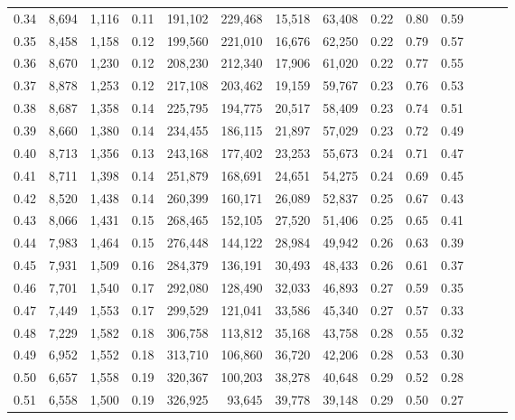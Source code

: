 \begin{tabular}{rrrrrrrrrrrrrr}
0.34 &   8,694 &  1,116 &  0.11 &  191,102 &  229,468 &  15,518 &  63,408 &  0.22 &  0.80 &      0.59 \\
0.35 &   8,458 &  1,158 &  0.12 &  199,560 &  221,010 &  16,676 &  62,250 &  0.22 &  0.79 &      0.57 \\
0.36 &   8,670 &  1,230 &  0.12 &  208,230 &  212,340 &  17,906 &  61,020 &  0.22 &  0.77 &      0.55 \\
0.37 &   8,878 &  1,253 &  0.12 &  217,108 &  203,462 &  19,159 &  59,767 &  0.23 &  0.76 &      0.53 \\
0.38 &   8,687 &  1,358 &  0.14 &  225,795 &  194,775 &  20,517 &  58,409 &  0.23 &  0.74 &      0.51 \\
0.39 &   8,660 &  1,380 &  0.14 &  234,455 &  186,115 &  21,897 &  57,029 &  0.23 &  0.72 &      0.49 \\
0.40 &   8,713 &  1,356 &  0.13 &  243,168 &  177,402 &  23,253 &  55,673 &  0.24 &  0.71 &      0.47 \\
0.41 &   8,711 &  1,398 &  0.14 &  251,879 &  168,691 &  24,651 &  54,275 &  0.24 &  0.69 &      0.45 \\
0.42 &   8,520 &  1,438 &  0.14 &  260,399 &  160,171 &  26,089 &  52,837 &  0.25 &  0.67 &      0.43 \\
0.43 &   8,066 &  1,431 &  0.15 &  268,465 &  152,105 &  27,520 &  51,406 &  0.25 &  0.65 &      0.41 \\
0.44 &   7,983 &  1,464 &  0.15 &  276,448 &  144,122 &  28,984 &  49,942 &  0.26 &  0.63 &      0.39 \\
0.45 &   7,931 &  1,509 &  0.16 &  284,379 &  136,191 &  30,493 &  48,433 &  0.26 &  0.61 &      0.37 \\
0.46 &   7,701 &  1,540 &  0.17 &  292,080 &  128,490 &  32,033 &  46,893 &  0.27 &  0.59 &      0.35 \\
0.47 &   7,449 &  1,553 &  0.17 &  299,529 &  121,041 &  33,586 &  45,340 &  0.27 &  0.57 &      0.33 \\
0.48 &   7,229 &  1,582 &  0.18 &  306,758 &  113,812 &  35,168 &  43,758 &  0.28 &  0.55 &      0.32 \\
0.49 &   6,952 &  1,552 &  0.18 &  313,710 &  106,860 &  36,720 &  42,206 &  0.28 &  0.53 &      0.30 \\
0.50 &   6,657 &  1,558 &  0.19 &  320,367 &  100,203 &  38,278 &  40,648 &  0.29 &  0.52 &      0.28 \\
0.51 &   6,558 &  1,500 &  0.19 &  326,925 &   93,645 &  39,778 &  39,148 &  0.29 &  0.50 &      0.27 \\

\end{tabular}
